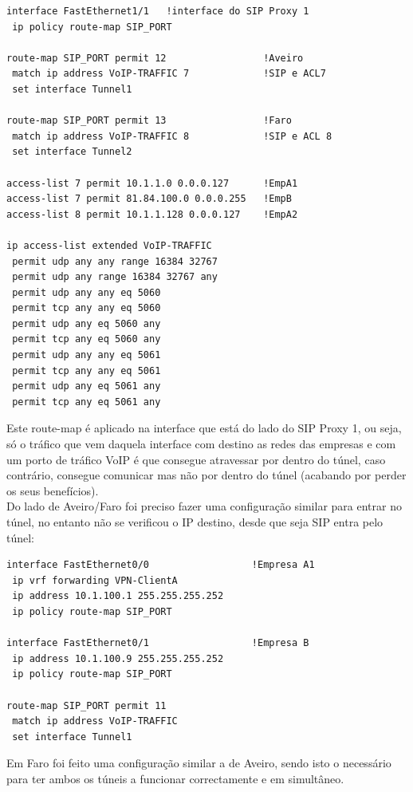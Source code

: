 \documentclass[11pt,a4paper]{report}
\begin{document}
\begin{lstlisting}[caption=MPLS Tunnel - Lisboa rota de entrada no túnel]
interface FastEthernet1/1 	!interface do SIP Proxy 1
 ip policy route-map SIP_PORT

route-map SIP_PORT permit 12                 !Aveiro
 match ip address VoIP-TRAFFIC 7             !SIP e ACL7
 set interface Tunnel1              

route-map SIP_PORT permit 13                 !Faro
 match ip address VoIP-TRAFFIC 8             !SIP e ACL 8
 set interface Tunnel2

access-list 7 permit 10.1.1.0 0.0.0.127      !EmpA1
access-list 7 permit 81.84.100.0 0.0.0.255   !EmpB
access-list 8 permit 10.1.1.128 0.0.0.127    !EmpA2

ip access-list extended VoIP-TRAFFIC
 permit udp any any range 16384 32767
 permit udp any range 16384 32767 any
 permit udp any any eq 5060
 permit tcp any any eq 5060
 permit udp any eq 5060 any
 permit tcp any eq 5060 any
 permit udp any any eq 5061
 permit tcp any any eq 5061
 permit udp any eq 5061 any
 permit tcp any eq 5061 any
\end{lstlisting}

Este route-map é aplicado na interface que está do lado do SIP Proxy 1, ou seja, só o tráfico que vem daquela interface com destino as redes das empresas e com um porto de tráfico VoIP é que consegue atravessar por dentro do túnel, caso contrário, consegue comunicar mas não por dentro do túnel (acabando por perder os seus benefícios).\\

Do lado de Aveiro/Faro foi preciso fazer uma configuração similar para entrar no túnel, no entanto não se verificou o IP destino, desde que seja SIP entra pelo túnel:

\begin{lstlisting}[caption=MPLS Tunnel - Aveiro rota de entrada no túnel]
interface FastEthernet0/0                  !Empresa A1
 ip vrf forwarding VPN-ClientA
 ip address 10.1.100.1 255.255.255.252
 ip policy route-map SIP_PORT

interface FastEthernet0/1                  !Empresa B
 ip address 10.1.100.9 255.255.255.252
 ip policy route-map SIP_PORT

route-map SIP_PORT permit 11
 match ip address VoIP-TRAFFIC
 set interface Tunnel1
\end{lstlisting}

Em Faro foi feito uma configuração similar a de Aveiro, sendo isto o necessário para ter ambos os túneis a funcionar correctamente e em simultâneo.
\end{document}
